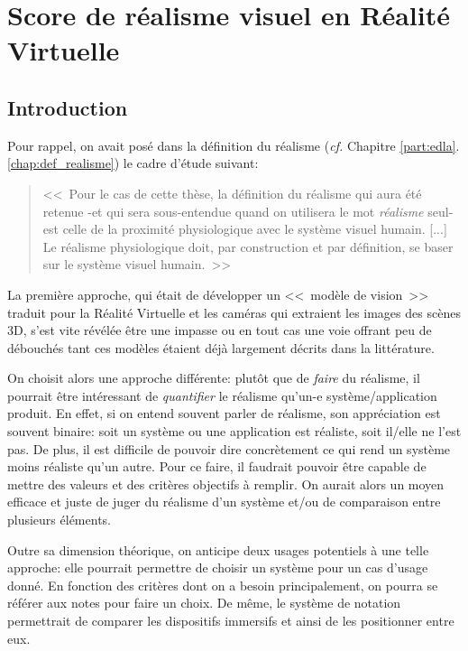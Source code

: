 \part{Score de réalisme visuel en Réalité Virtuelle}
	\chapter*{Introduction}
	\par Pour rappel, on avait posé dans la définition du réalisme (\textit{cf.} Chapitre \ref{part:edla}.\ref{chap:def_realisme}) le cadre d'étude suivant:
	\begin{quote}
		<<~Pour le cas de cette thèse, la définition du réalisme qui aura été retenue -et qui sera sous-entendue quand on utilisera le mot \textit{réalisme} seul- est celle de la proximité physiologique avec le système visuel humain. [...] Le réalisme physiologique doit, par construction et par définition, se baser sur le système visuel humain.~>>
	\end{quote}
	La première approche, qui était de développer un <<~modèle de vision~>> traduit pour la Réalité Virtuelle et les caméras qui extraient les images des scènes 3D, s'est vite révélée être une impasse ou en tout cas une voie offrant peu de débouchés tant ces modèles étaient déjà largement décrits dans la littérature.
	
	\par On choisit alors une approche différente: plutôt que de \textit{faire} du réalisme, il pourrait être intéressant de \textit{quantifier} le réalisme qu'un-e système/application produit. En effet, si on entend souvent parler de réalisme, son appréciation est souvent binaire: soit un système ou une application est réaliste, soit il/elle ne l'est pas. De plus, il est difficile de pouvoir dire concrètement ce qui rend un système moins réaliste qu'un autre. Pour ce faire, il faudrait pouvoir être capable de mettre des valeurs et des critères objectifs à remplir. On aurait alors un moyen efficace et juste de juger du réalisme d'un système et/ou de comparaison entre plusieurs éléments.
	
	\par Outre sa dimension théorique, on anticipe deux usages potentiels à une telle approche: elle pourrait permettre de choisir un système pour un cas d'usage donné. En fonction des critères dont on a besoin principalement, on pourra se référer aux notes pour faire un choix. De même, le système de notation permettrait de comparer les dispositifs immersifs et ainsi de les positionner entre eux.